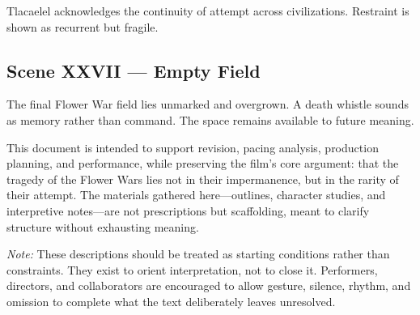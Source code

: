 \documentclass[12pt]{article}
\begin{document}
Tlacaelel acknowledges the continuity of attempt across civilizations. Restraint is shown as recurrent but fragile.

\subsection*{Scene XXVII — Empty Field}

The final Flower War field lies unmarked and overgrown. A death whistle sounds as memory rather than command. The space remains available to future meaning.

\bigskip

This document is intended to support revision, pacing analysis, production planning, and performance, while preserving the film's core argument: that the tragedy of the Flower Wars lies not in their impermanence, but in the rarity of their attempt. The materials gathered here—outlines, character studies, and interpretive notes—are not prescriptions but scaffolding, meant to clarify structure without exhausting meaning.

\bigskip

\textit{Note:} These descriptions should be treated as starting conditions rather than constraints. They exist to orient interpretation, not to close it. Performers, directors, and collaborators are encouraged to allow gesture, silence, rhythm, and omission to complete what the text deliberately leaves unresolved.
\end{document}
